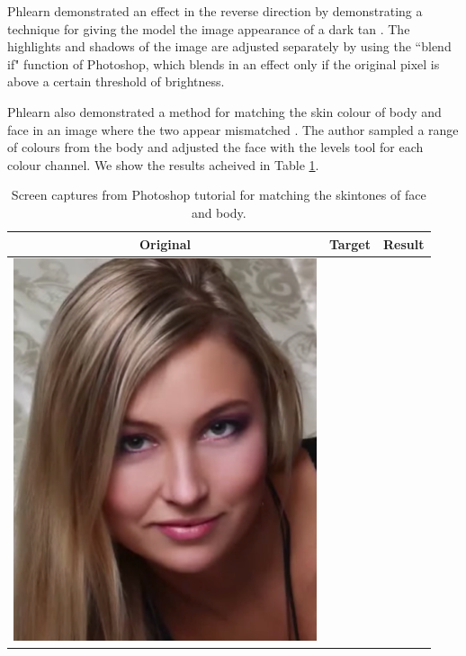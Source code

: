 Phlearn demonstrated an effect in the reverse direction by demonstrating a technique for giving the model the image appearance of a dark tan \cite{photoshop:tan}. The highlights and shadows of the image are adjusted separately by using the ``blend if" function of Photoshop, which blends in an effect only if the original pixel is above a certain threshold of brightness.

Phlearn also demonstrated a method for matching the skin colour of body and face in an image where the two appear mismatched \cite{photoshop:match_body}. The author sampled a range of colours from the body and adjusted the face with the levels tool for each colour channel. We show the results acheived in Table \ref{tab:match_body_demo}.

\begin{longtable}{|c|c|c|}
    \caption{Screen captures from Photoshop tutorial for matching the skintones of face and body. \label{tab:match_body_demo}}\\
    \hline
    Original & Target & Result \\
    \hline
  \begin{minipage}{.29\textwidth}
    \includegraphics[width=\textwidth,height=\textheight,keepaspectratio]{images/match_body_orig}

\end{minipage}
\end{longtable}
